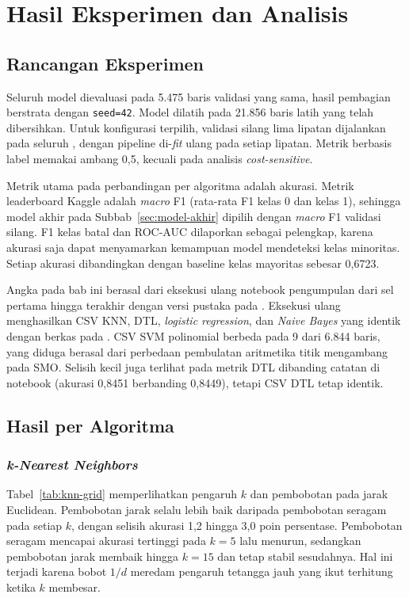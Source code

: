 \clearpage
\section{Hasil Eksperimen dan Analisis}
\subsection{Rancangan Eksperimen}
Seluruh model dievaluasi pada 5.475 baris validasi yang sama, hasil pembagian berstrata dengan \texttt{seed=42}. Model dilatih pada 21.856 baris latih yang telah dibersihkan. Untuk konfigurasi terpilih, validasi silang lima lipatan dijalankan pada seluruh , dengan pipeline di-\textit{fit} ulang pada setiap lipatan. Metrik berbasis label memakai ambang 0,5, kecuali pada analisis \textit{cost-sensitive}.

Metrik utama pada perbandingan per algoritma adalah akurasi. Metrik leaderboard Kaggle adalah \textit{macro} F1 (rata-rata F1 kelas 0 dan kelas 1), sehingga model akhir pada Subbab~\ref{sec:model-akhir} dipilih dengan \textit{macro} F1 validasi silang. F1 kelas batal dan ROC-AUC dilaporkan sebagai pelengkap, karena akurasi saja dapat menyamarkan kemampuan model mendeteksi kelas minoritas. Setiap akurasi dibandingkan dengan baseline kelas mayoritas sebesar 0,6723.

Angka pada bab ini berasal dari eksekusi ulang notebook pengumpulan dari sel pertama hingga terakhir dengan versi pustaka pada . Eksekusi ulang menghasilkan CSV KNN, DTL, \textit{logistic regression}, dan \textit{Naive Bayes} yang identik dengan berkas pada . CSV SVM polinomial berbeda pada 9 dari 6.844 baris, yang diduga berasal dari perbedaan pembulatan aritmetika titik mengambang pada SMO. Selisih kecil juga terlihat pada metrik DTL dibanding catatan di notebook (akurasi 0,8451 berbanding 0,8449), tetapi CSV DTL tetap identik.

\subsection{Hasil per Algoritma}
\subsubsection{\textit{k-Nearest Neighbors}}\label{sec:hasil-knn}
Tabel~\ref{tab:knn-grid} memperlihatkan pengaruh $k$ dan pembobotan pada jarak Euclidean. Pembobotan jarak selalu lebih baik daripada pembobotan seragam pada setiap $k$, dengan selisih akurasi 1,2 hingga 3,0 poin persentase. Pembobotan seragam mencapai akurasi tertinggi pada $k=5$ lalu menurun, sedangkan pembobotan jarak membaik hingga $k=15$ dan tetap stabil sesudahnya. Hal ini terjadi karena bobot $1/d$ meredam pengaruh tetangga jauh yang ikut terhitung ketika $k$ membesar.

